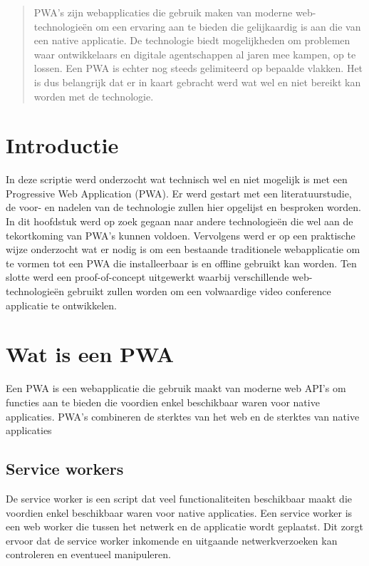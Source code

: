 \documentclass[a0,portrait]{a0poster}
\begin{document}
\begin{multicols}{2}

\color{HoGentAccent1}

\begin{abstract}
	PWA's zijn webapplicaties die gebruik maken van moderne web-technologieën om een ervaring aan te bieden die gelijkaardig is aan die van een native applicatie. 
	De technologie biedt mogelijkheden om problemen waar ontwikkelaars en digitale agentschappen al jaren mee kampen, op te lossen.  Een PWA is echter nog steeds gelimiteerd op bepaalde vlakken. 
	Het is dus belangrijk dat er in kaart gebracht werd wat wel en niet bereikt kan worden met de technologie.
\end{abstract}


\color{HoGentAccent1} 
\section*{Introductie}
\color{black}
\color{black}

	In deze scriptie werd onderzocht wat technisch wel en niet mogelijk is met een Progressive Web Application (PWA). Er werd gestart met een literatuurstudie, de voor- en nadelen van de technologie zullen hier opgelijst en besproken worden.
	In dit hoofdstuk werd op zoek gegaan naar andere technologieën die wel aan de tekortkoming van PWA's kunnen voldoen.
	Vervolgens werd er op een praktische wijze onderzocht wat er nodig is om een bestaande traditionele webapplicatie om te vormen tot een PWA die installeerbaar is en offline gebruikt kan worden.
	Ten slotte werd een proof-of-concept uitgewerkt waarbij verschillende web-technologieën gebruikt zullen worden om een volwaardige video conference applicatie te ontwikkelen. 

\color{Black}
\color{HoGentAccent1} 
\section*{Wat is een PWA}
\color{black}

	Een PWA is een webapplicatie die gebruik maakt van moderne web API’s om functies aan te bieden die voordien enkel beschikbaar waren voor native applicaties. PWA’s combineren de sterktes van het web en de sterktes van native applicaties
	
	\subsection{Service workers}
		De service worker is een script dat veel functionaliteiten beschikbaar maakt die voordien enkel beschikbaar waren voor native applicaties. Een service worker is een web worker die tussen het netwerk en de applicatie wordt geplaatst. Dit zorgt ervoor dat de service worker inkomende en uitgaande netwerkverzoeken kan controleren en eventueel manipuleren.
		

\end{multicols}
\end{document}

